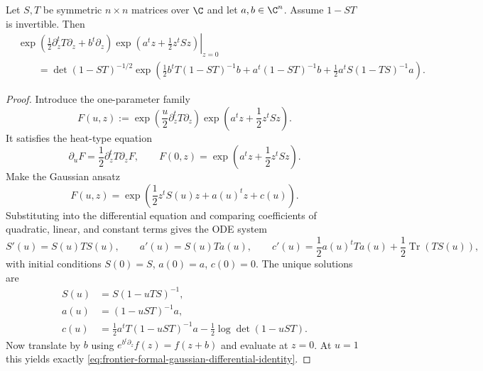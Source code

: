 \begin{lemma}
\label{lem:frontier-formal-gaussian-differential-identity}
Let $S,T$ be symmetric $n\times n$ matrices over $\C$ and let $a,b\in\C^n$.
Assume $1-ST$ is invertible.
Then
\begin{align}
&\left.
\exp\!\left(\frac12 \partial_z^t T\partial_z + b^t\partial_z\right)
\exp\!\left(a^t z + \frac12 z^t S z\right)
\right|_{z=0}
\nonumber\\[4pt]
&\qquad=
\det(1-ST)^{-1/2}
\exp\!\left(
\frac12 b^t T(1-ST)^{-1}b
+ a^t(1-ST)^{-1}b
+ \frac12 a^t S(1-TS)^{-1}a
\right).
\label{eq:frontier-formal-gaussian-differential-identity}
\end{align}
\end{lemma}

\begin{proof}
Introduce the one-parameter family
\[
F(u,z)
:=
\exp\!\left(\frac{u}{2}\partial_z^t T\partial_z\right)
\exp\!\left(a^t z + \frac12 z^t S z\right).
\]
It satisfies the heat-type equation
\begin{equation}\label{eq:frontier-gaussian-heat-equation}
\partial_u F = \frac12\partial_z^t T\partial_z F,
\qquad
F(0,z)=\exp\!\left(a^t z + \frac12 z^t S z\right).
\end{equation}
Make the Gaussian ansatz
\begin{equation}\label{eq:frontier-gaussian-ansatz}
F(u,z)=
\exp\!\left(
\frac12 z^t S(u)z + a(u)^t z + c(u)
\right).
\end{equation}
Substituting into the differential equation and comparing coefficients of
quadratic, linear, and constant terms gives the ODE system
\begin{equation}\label{eq:frontier-gaussian-ode-system}
S'(u)=S(u)TS(u),
\qquad
a'(u)=S(u)Ta(u),
\qquad
c'(u)=\frac12 a(u)^tTa(u)+\frac12\operatorname{Tr}(TS(u)),
\end{equation}
with initial conditions $S(0)=S$, $a(0)=a$, $c(0)=0$.
The unique solutions are
\begin{align}
S(u)&=S(1-uTS)^{-1},
\label{eq:frontier-gaussian-ode-solution-S}\\
 a(u)&=(1-uST)^{-1}a,
\label{eq:frontier-gaussian-ode-solution-a}\\
 c(u)&=
 \frac12 a^tT(1-uST)^{-1}a
 -\frac12\log\det(1-uST).
\label{eq:frontier-gaussian-ode-solution-c}
\end{align}
Now translate by $b$ using $e^{b^t\partial_z}f(z)=f(z+b)$ and evaluate at
$z=0$. At $u=1$ this yields exactly
\eqref{eq:frontier-formal-gaussian-differential-identity}.
\end{proof}

